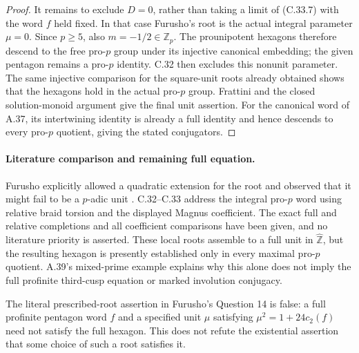 \begin{proof}
It remains to exclude $D=0$, rather than taking a limit of
(C.33.7) with the word $f$ held fixed. In that case Furusho's
root is the actual integral parameter $\mu=0$. Since $p\geq5$,
also $m=-1/2\in\mathbb Z_p$. The prounipotent hexagons therefore
descend to the free pro-$p$ group under its injective canonical
embedding; the given pentagon remains a pro-$p$ identity.
C.32 then excludes this nonunit parameter. The same injective
comparison for the square-unit roots already obtained shows that
the hexagons hold in the actual pro-$p$ group. Frattini and the
closed solution-monoid argument give the final unit assertion.
For the canonical word of A.37, its intertwining identity is
already a full identity and hence descends to every pro-$p$
quotient, giving the stated conjugators.
\end{proof}

\paragraph{Literature comparison and remaining full equation.}
Furusho explicitly allowed a quadratic extension for the root and
observed that it might fail to be a $p$-adic unit
\cite[paragraph following Corollary 13]{Furusho2010}.
C.32--C.33 address the integral pro-$p$ word using relative braid
torsion and the displayed Magnus coefficient. The exact full and
relative completions and all coefficient comparisons have been
given, and no literature priority is asserted. These local roots
assemble to a full unit in $\widehat{\mathbb Z}$, but the resulting
hexagon is presently established only in every maximal pro-$p$
quotient. A.39's mixed-prime example explains why this alone does
not imply the full profinite third-cusp equation or marked
involution conjugacy.

The literal prescribed-root assertion in Furusho's Question 14
\cite{Furusho2010} is false: a full profinite pentagon word $f$ and
a specified unit $\mu$ satisfying $\mu^2=1+24c_2(f)$ need not
satisfy the full hexagon. This does not refute the existential
assertion that some choice of such a root satisfies it.

